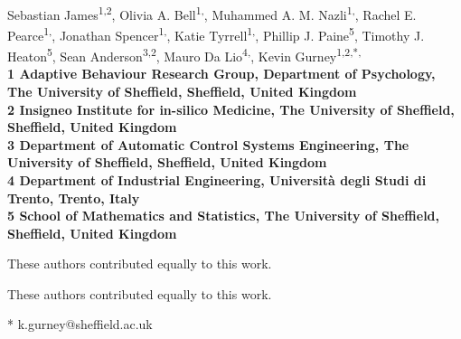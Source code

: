 \documentclass[10pt,letterpaper]{article}
\date{}
\begin{document}
\vspace*{0.35in}

\begin{flushleft}
{\Large
\textbf{}
}
\newline
\\
Sebastian James\textsuperscript{1,2},
Olivia A. Bell\textsuperscript{1,\Yinyang},
Muhammed A. M. Nazli\textsuperscript{1,\Yinyang},
Rachel E. Pearce\textsuperscript{1,\Yinyang},
Jonathan Spencer\textsuperscript{1,\Yinyang},
Katie Tyrrell\textsuperscript{1,\Yinyang},
Phillip J. Paine\textsuperscript{5},
Timothy J. Heaton\textsuperscript{5},
Sean Anderson\textsuperscript{3,2},
Mauro Da Lio\textsuperscript{4,\ddag},
Kevin Gurney\textsuperscript{1,2,*,\ddag}
\\
\bigskip
\bf{1} Adaptive Behaviour Research Group, Department of Psychology, The University of Sheffield, Sheffield, United Kingdom
\\
\bf{2} Insigneo Institute for in-silico Medicine, The University of Sheffield, Sheffield, United Kingdom
\\
\bf{3} Department of Automatic Control Systems Engineering, The University of Sheffield, Sheffield, United Kingdom
\\
\bf{4} Department of Industrial Engineering, Universit\`{a} degli Studi di Trento, Trento, Italy
\\
\bf{5} School of Mathematics and Statistics, The University of Sheffield, Sheffield, United Kingdom
\\\bigskip

%
%
\Yinyang These authors contributed equally to this work.

\ddag These authors contributed equally to this work.



* k.gurney@sheffield.ac.uk

\end{flushleft}
\end{document}
